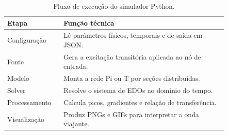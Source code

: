 \begin{table}[H]
\centering
\caption{Fluxo de execução do simulador Python.}
\label{tab:fluxo-python}
\begin{tabular}{p{0.23\linewidth}p{0.67\linewidth}}
\toprule
Etapa & Função técnica \\
\midrule
Configuração & Lê parâmetros físicos, temporais e de saída em JSON. \\
Fonte & Gera a excitação transitória aplicada ao nó de entrada. \\
Modelo & Monta a rede Pi ou T por seções distribuídas. \\
Solver & Resolve o sistema de EDOs no domínio do tempo. \\
Processamento & Calcula picos, gradientes e relação de transferência. \\
Visualização & Produz PNGs e GIFs para interpretar a onda viajante. \\
\bottomrule
\end{tabular}
\end{table}
